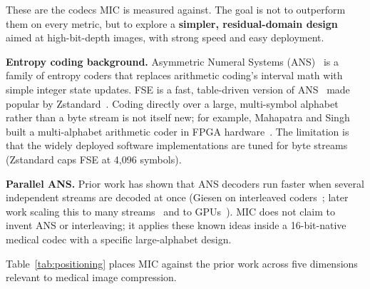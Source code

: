 \documentclass[journal]{IEEEtran}
\begin{document}
These are the codecs MIC is measured against. The goal is not to outperform
them on every metric, but to explore a \textbf{simpler, residual-domain design}
aimed at high-bit-depth images, with strong speed and easy deployment.

\textbf{Entropy coding background.} Asymmetric Numeral Systems
(ANS)~\cite{duda2009,duda2013} is a family of entropy coders that replaces
arithmetic coding's interval math with simple integer state updates. FSE is a
fast, table-driven version of ANS~\cite{fse} made popular by
Zstandard~\cite{rfc8878}. Coding directly over a large, multi-symbol alphabet
rather than a byte stream is not itself new; for example, Mahapatra and Singh
built a multi-alphabet arithmetic coder in FPGA hardware~\cite{mahapatra2007}.
The limitation is that the widely deployed software implementations are tuned
for byte streams (Zstandard caps FSE at 4,096 symbols).

\textbf{Parallel ANS.} Prior work has shown that ANS decoders run faster when
several independent streams are decoded at once (Giesen on interleaved
coders~\cite{giesen2014}; later work scaling this to many
streams~\cite{lin2023} and to GPUs~\cite{weissenberger2019}). MIC does not claim
to invent ANS or interleaving; it applies these known ideas inside a
16-bit-native medical codec with a specific large-alphabet design.

Table~\ref{tab:positioning} places MIC against the prior work across five
dimensions relevant to medical image compression.

\begin{table}[htbp]
\centering
\caption{Feature comparison of MIC with related codecs and entropy coders.
``16-bit residual as one symbol'' concerns the entropy stage only: JPEG-LS and
HTJ2K handle 16-bit images, but their entropy stages (Golomb--Rice, bit-plane
coding) do not treat the predicted residual as a single 16-bit symbol.
Source-line counts are order-of-magnitude context.}
\label{tab:positioning}
\scriptsize
\setlength{\tabcolsep}{3pt}
\end{table}
\end{document}
